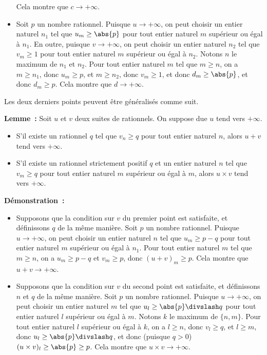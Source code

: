 \begin{itemize}[nosep]
        Cela montre que $c \rightarrow +\infty$.
    \item Soit $p$ un nombre rationnel.
        Puisque $u \rightarrow +\infty$, on peut choisir un entier naturel $n_1$ tel que $u_m \geq \abs{p}$ pour tout entier naturel $m$ supérieur ou égal à $n_1$.
        En outre, puisque $v \rightarrow +\infty$, on peut choisir un entier naturel $n_2$ tel que $v_m \geq 1$ pour tout entier naturel $m$ supérieur ou égal à $n_2$.
        Notons $n$ le maximum de $n_1$ et $n_2$.
        Pour tout entier naturel $m$ tel que $m \geq n$, on a $m \geq n_1$, donc $u_m \geq p$, et $m \geq n_2$, donc $v_m \geq 1$, et donc $d_m \geq \abs{p}$, et donc $d_m \geq p$.
        Cela montre que $d \rightarrow +\infty$.
\end{itemize}

\done

\medskip

\noindent Les deux derniers points peuvent être généralisés comme suit.

\medskip

\noindent\textbf{Lemme :} Soit $u$ et $v$ deux suites de rationnels.
    On suppose due $u$ tend vers $+\infty$.
    \begin{itemize}[nosep]
        \item S'il existe un rationnel $q$ tel que $v_n \geq q$ pour tout entier naturel $n$, alors $u + v$ tend vers $+\infty$.
        \item S'il existe un rationnel strictement positif $q$ et un entier naturel $n$ tel que $v_m \geq q$ pour tout entier naturel $m$ supérieur ou égal à $m$, alors $u \times v$ tend vers $+\infty$.
    \end{itemize}

\medskip

\noindent\textbf{Démonstration :} 
\begin{itemize}[nosep]
    \item Supposons que la condition sur $v$ du premier point est satisfaite, et définissons $q$ de la même manière.
        Soit $p$ un nombre rationnel.
        Puisque $u \rightarrow +\infty$, on peut choisir un entier naturel $n$ tel que $u_m \geq p - q$ pour tout entier naturel $m$ supérieur ou égal à $n_1$.
        Pour tout entier naturel $m$ tel que $m \geq n$, on a $u_m \geq p - q$ et $v_m \geq p$, donc $(u + v)_m \geq p$.
        Cela montre que $u + v \rightarrow +\infty$.
    \item Supposons que la condition sur $v$ du second point est satisfaite, et définissons $n$ et $q$ de la même manière.
        Soit $p$ un nombre rationnel. 
        Puisque $u \rightarrow +\infty$, on peut choisir un entier naturel $m$ tel que $u_l \geq \abs{p} \divslash q$ pour tout entier naturel $l$ supérieur ou égal à $m$.
        Notons $k$ le maximum de $\lbrace n, m \rbrace$.
        Pour tout entier naturel $l$ supérieur ou égal à $k$, on a $l \geq n$, donc $v_l \geq q$, et $l \geq m$, donc $u_l \geq \abs{p} \divslash q$, et donc (puisque $q > 0$) $(u \times v)_l \geq \abs{p} \geq p$.
        Cela montre que $u \times v \rightarrow +\infty$.
\end{itemize}


